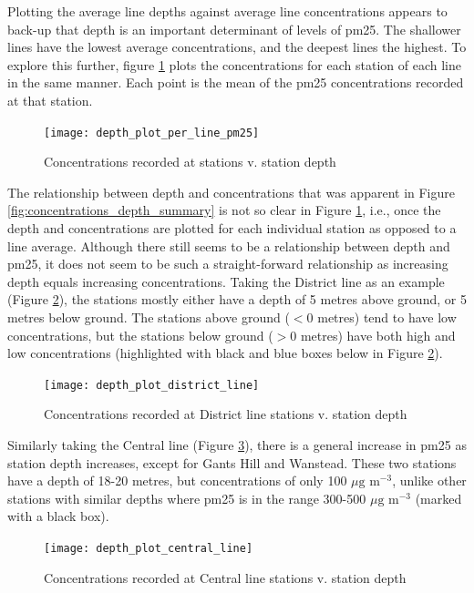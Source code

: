 Plotting the average line depths against average line concentrations appears to back-up that depth is an important determinant of levels of \gls{pm25}. The shallower lines have the lowest average concentrations, and the deepest lines the highest. To explore this further, figure \ref{fig:depth_plot_per_line_pm25} plots the concentrations for each station of each line in the same manner. Each point is the mean of the \gls{pm25} concentrations recorded at that station.

\begin{figure}[H]
\centering
\texttt{[image: depth\_plot\_per\_line\_pm25]}
\caption{Concentrations recorded at stations v. station depth}
\label{fig:depth_plot_per_line_pm25}
\end{figure}

The relationship between depth and concentrations that was apparent in Figure \ref{fig:concentrations_depth_summary} is not so clear in Figure \ref{fig:depth_plot_per_line_pm25}, i.e., once the depth and concentrations are plotted for each individual station as opposed to a line average. Although there still seems to be a relationship between depth and \gls{pm25}, it does not seem to be such a straight-forward relationship as increasing depth equals increasing concentrations. Taking the District line as an example (Figure \ref{fig:depth_plot_district_line}), the stations mostly either have a depth of 5 metres above ground, or 5 metres below ground. The stations above ground ($<0$ metres) tend to have low concentrations, but the stations below ground ($>0$ metres) have both high and low concentrations (highlighted with black and blue boxes below in Figure \ref{fig:depth_plot_district_line}).

\begin{figure}[H]
\centering
\texttt{[image: depth\_plot\_district\_line]}
\caption{Concentrations recorded at District line stations v. station depth}
\label{fig:depth_plot_district_line}
\end{figure}

Similarly taking the Central line (Figure \ref{fig:depth_plot_central_line}), there is a general increase in \gls{pm25} as station depth increases, except for Gants Hill and Wanstead. These two stations have a depth of 18-20 metres, but concentrations of only 100 $\mu \text{g m}^{-3}$, unlike other stations with similar depths where \gls{pm25} is in the range 300-500 $\mu \text{g m}^{-3}$ (marked with a black box).

\begin{figure}[H]
\centering
\texttt{[image: depth\_plot\_central\_line]}
\caption{Concentrations recorded at Central line stations v. station depth}
\label{fig:depth_plot_central_line}
\end{figure}

